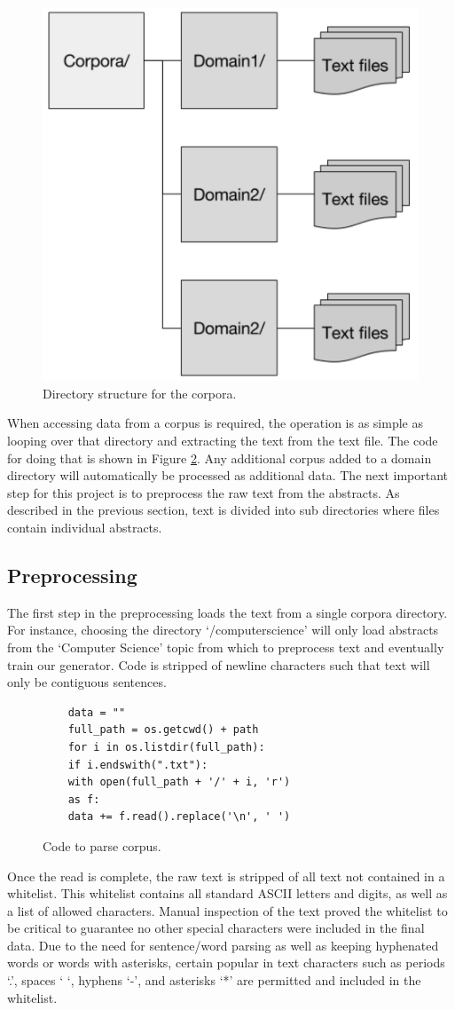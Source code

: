 \documentclass[letterpaper, 10 pt, conference]{ieeeconf}  %
\begin{document}
\begin{figure}[!ht]
	\centering
	\includegraphics[width=.4\textwidth]{filestruct}
	\caption{Directory structure for the corpora.}
	\label{fig:Directorystructure}
\end{figure}

When accessing data from a corpus is required, the operation is as simple as looping over that directory and extracting the text from the text file. The code for doing that is shown in Figure  \ref{fig:Codeparse}.  Any additional corpus added to a domain directory will automatically be processed as additional data. The next important step for this project is to preprocess the raw text from the abstracts. As described in the previous section, text is divided into sub directories where files contain individual abstracts. 

\subsection{Preprocessing}

The first step in the preprocessing loads the text from a single corpora directory. For instance, choosing the directory ‘/computerscience’ will only load abstracts from the ‘Computer Science’ topic from which to preprocess text and eventually train our generator. Code is stripped of newline characters such that text will only be contiguous sentences.

\begin{figure}[!ht]
	\begin{verbatim}
	data = ""
	full_path = os.getcwd() + path
	for i in os.listdir(full_path):
	if i.endswith(".txt"):
	with open(full_path + '/' + i, 'r') 
	as f:
	data += f.read().replace('\n', ' ')
	\end{verbatim}
	
	\caption{Code to parse corpus.}
	\label{fig:Codeparse}
\end{figure}

Once the read is complete, the raw text is stripped of all text not contained in a whitelist. This whitelist contains all standard ASCII letters and digits, as well as a list of allowed characters. Manual inspection of the text proved the whitelist to be critical to guarantee no other special characters were included in the final data. Due to the need for sentence/word parsing as well as keeping hyphenated words or words with asterisks, certain popular in text characters such as periods ‘.’, spaces ‘ ‘, hyphens ‘-’, and asterisks ‘*’ are permitted and included in the whitelist. 
\end{document}
